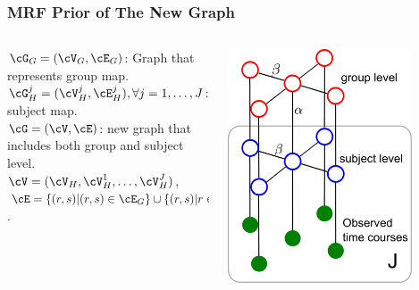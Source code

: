 \documentclass[serif]{beamer}
\begin{document}
\begin{frame}
  \frametitle{MRF Prior of The New Graph}
  \begin{columns}
    \begin{column}{7.5cm}  
      \begin{definition}
        $\cG_G = (\cV_G, \cE_G)$: Graph that represents group map.\\
        $\cG_H^j = (\cV_H^j, \cE_H^j), \forall j = 1, \dots, J$: subject map. \\
        $\cG=(\cV, \cE)$: new graph that includes both group and subject level. \\
        $\cV = (\cV_H, \cV_H^1, \dots, \cV_H^J)$, $\cE = \{(r,s) | (r,s) \in \cE_G\} \cup \{(r,s) | r \in \cV_G, s\in \cV_H^j, r\simeq s\} \cup \{(r,s) | (r,s) \in \cE_H^j\}$.
      \end{definition}
    \end{column}

    \begin{column}{4cm}
      \includegraphics[width=0.8\textwidth]{figure1/grp2}
    \end{column}
  \end{columns}
\end{frame}
\end{document}
